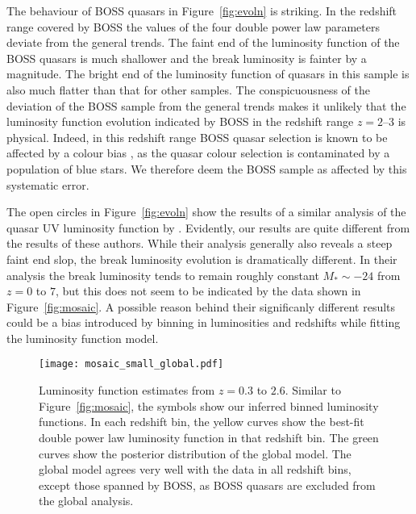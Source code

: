 \documentclass[a4paper,fleqn,usenatbib]{mnras}
\begin{document}
The behaviour of BOSS quasars in Figure~\ref{fig:evoln} is striking.
In the redshift range covered by BOSS the values of the four double
power law parameters deviate from the general trends.  The faint end
of the luminosity function of the BOSS quasars is much shallower and
the break luminosity is fainter by a magnitude.  The bright end of the
luminosity function of quasars in this sample is also much flatter
than that for other samples.  The conspicuousness of the deviation of
the BOSS sample from the general trends makes it unlikely that the
luminosity function evolution indicated by BOSS in the redshift range
$z=2$--$3$ is physical.  Indeed, in this redshift range BOSS quasar
selection is known to be affected by a colour bias
\citep{2011ApJ...728...23W}, as the quasar colour selection is
contaminated by a population of blue stars.  We therefore deem the
BOSS sample as affected by this systematic error.

The open circles in Figure~\ref{fig:evoln} show the results of a
similar analysis of the quasar UV luminosity function by
\citep{2017MNRAS.466.1160M}.  Evidently, our results are quite
different from the results of these authors.  While their analysis
generally also reveals a steep faint end slop, the break luminosity
evolution is dramatically different.  In their analysis the break
luminosity tends to remain roughly constant $M_*\sim -24$ from $z=0$
to $7$, but this does not seem to be indicated by the data shown in
Figure~\ref{fig:mosaic}.  A possible reason behind their significanly
different results could be a bias introduced by binning in
luminosities and redshifts while fitting the luminosity function model.

\begin{figure*}
  \begin{center}
    \texttt{[image: mosaic\_small\_global.pdf]}
  \end{center}
  \caption{Luminosity function estimates from $z=0.3$ to $2.6$.
    Similar to Figure~\ref{fig:mosaic}, the symbols show our inferred
    binned luminosity functions.  In each redshift bin, the yellow
    curves show the best-fit double power law luminosity function in
    that redshift bin.  The green curves show the posterior
    distribution of the global model.  The global model agrees very
    well with the data in all redshift bins, except those spanned by
    BOSS, as BOSS quasars are excluded from the global analysis.}
  \label{fig:mosaic_global}
\end{figure*}
\end{document}
